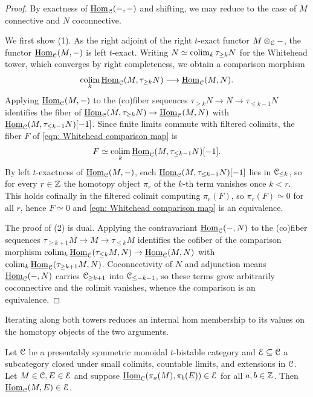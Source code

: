 \begin{proof}
    By exactness of $\underline{\mathrm{Hom}}_{\EuScript{C}}(-,-)$ and shifting, we may reduce to the case of $M$ connective and $N$ coconnective. 

    We first show (1). As the right adjoint of the right $t$-exact functor $M\otimes_{\EuScript{C}}-$, the functor $\underline{\mathrm{Hom}}_{\EuScript{C}}(M,-)$ is left $t$-exact. Writing $N\simeq\operatorname*{colim}_{k}\tau_{\geq k}N$ for the Whitehead tower, which converges by right completeness, we obtain a comparison morphism
    \begin{equation}\label{eqn: Whitehead comparison map}
        \operatorname*{colim}_{k}\underline{\mathrm{Hom}}_{\EuScript{C}}(M,\tau_{\geq k}N)\longrightarrow\underline{\mathrm{Hom}}_{\EuScript{C}}(M, N).
    \end{equation}
    Applying $\underline{\mathrm{Hom}}_{\EuScript{C}}(M,-)$ to the (co)fiber sequences $\tau_{\geq k}N\to N\to\tau_{\leq k-1}N$ identifies the fiber of $\underline{\mathrm{Hom}}_{\EuScript{C}}(M,\tau_{\geq k}N)\to\underline{\mathrm{Hom}}_{\EuScript{C}}(M,N)$ with $\underline{\mathrm{Hom}}_{\EuScript{C}}(M,\tau_{\leq k-1}N)[-1]$. Since finite limits commute with filtered colimits, the fiber $F$ of \eqref{eqn: Whitehead comparison map} is
    $$F\simeq\operatorname*{colim}_{k}\underline{\mathrm{Hom}}_{\EuScript{C}}(M,\tau_{\leq k-1}N)[-1].$$
    By left $t$-exactness of $\underline{\mathrm{Hom}}_{\EuScript{C}}(M,-)$, each $\underline{\mathrm{Hom}}_{\EuScript{C}}(M,\tau_{\leq k-1}N)[-1]$ lies in $\EuScript{C}_{\leq k}$, so for every $r\in\mathbb{Z}$ the homotopy object $\pi_{r}$ of the $k$-th term vanishes once $k<r$. This holds cofinally in the filtered colimit computing $\pi_{r}(F)$, so $\pi_{r}(F)\simeq0$ for all $r$, hence $F\simeq0$ and \eqref{eqn: Whitehead comparison map} is an equivalence. 

    The proof of (2) is dual. Applying the contravariant $\underline{\mathrm{Hom}}_{\EuScript{C}}(-,N)$ to the (co)fiber sequences $\tau_{\geq k+1}M\to M\to\tau_{\leq k}M$ identifies the cofiber of the comparison morphism $\operatorname*{colim}_{k}\underline{\mathrm{Hom}}_{\EuScript{C}}(\tau_{\leq k}M,N)\to\underline{\mathrm{Hom}}_{\EuScript{C}}(M,N)$ with $\operatorname*{colim}_{k}\underline{\mathrm{Hom}}_{\EuScript{C}}(\tau_{\geq k+1}M,N)$. Coconnectivity of $N$ and adjunction means $\underline{\mathrm{Hom}}_{\EuScript{C}}(-,N)$ carries $\EuScript{C}_{\geq k+1}$ into $\EuScript{C}_{\leq -k-1}$, so these terms grow arbitrarily coconnective and the colimit vanishes, whence the comparison is an equivalence.
\end{proof}
Iterating along both towers reduces an internal hom membership to its values on the homotopy objects of the two arguments.
\begin{corollary}\label{cor: hom membership}
    Let $\EuScript{C}$ be a presentably symmetric monoidal $t$-bistable category and $\EuScript{E}\subseteq\EuScript{C}$ a subcategory closed under small colimits, countable limits, and extensions in $\EuScript{C}$. Let $M\in\EuScript{C},E\in\EuScript{E}$ and suppose $\underline{\mathrm{Hom}}_{\EuScript{C}}(\pi_{a}(M),\pi_{b}(E))\in\EuScript{E}$ for all $a,b\in\mathbb{Z}$. Then $\underline{\mathrm{Hom}}_{\EuScript{C}}(M, E)\in\EuScript{E}$. 
\end{corollary}
